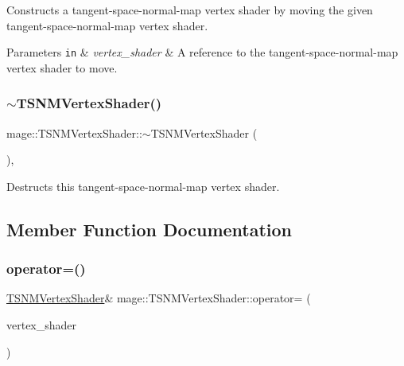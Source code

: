 Constructs a tangent-\/space-\/normal-\/map vertex shader by moving the given tangent-\/space-\/normal-\/map vertex shader.


\begin{DoxyParams}[1]{Parameters}
\mbox{\tt in}  & {\em vertex\+\_\+shader} & A reference to the tangent-\/space-\/normal-\/map vertex shader to move. \\
\hline
\end{DoxyParams}
\hypertarget{classmage_1_1_t_s_n_m_vertex_shader_ac753a201fc0c12978811cca636da107e}{}\label{classmage_1_1_t_s_n_m_vertex_shader_ac753a201fc0c12978811cca636da107e} 
\subsubsection{\texorpdfstring{$\sim$\+T\+S\+N\+M\+Vertex\+Shader()}{~TSNMVertexShader()}}
{\footnotesize\ttfamily mage\+::\+T\+S\+N\+M\+Vertex\+Shader\+::$\sim$\+T\+S\+N\+M\+Vertex\+Shader (\begin{DoxyParamCaption}{ }\end{DoxyParamCaption})\hspace{0.3cm}{\ttfamily [virtual]}, {\ttfamily [default]}}

Destructs this tangent-\/space-\/normal-\/map vertex shader. 

\subsection{Member Function Documentation}
\hypertarget{classmage_1_1_t_s_n_m_vertex_shader_ad3d444a889fcb9a736d0c0d2fba4ea88}{}\label{classmage_1_1_t_s_n_m_vertex_shader_ad3d444a889fcb9a736d0c0d2fba4ea88} 
\subsubsection{\texorpdfstring{operator=()}{operator=()}\hspace{0.1cm}{\footnotesize\ttfamily [1/2]}}
{\footnotesize\ttfamily \hyperlink{classmage_1_1_t_s_n_m_vertex_shader}{T\+S\+N\+M\+Vertex\+Shader}\& mage\+::\+T\+S\+N\+M\+Vertex\+Shader\+::operator= (\begin{DoxyParamCaption}\item[{const \hyperlink{classmage_1_1_t_s_n_m_vertex_shader}{T\+S\+N\+M\+Vertex\+Shader} \&}]{vertex\+\_\+shader }\end{DoxyParamCaption})\hspace{0.3cm}{\ttfamily [delete]}}

